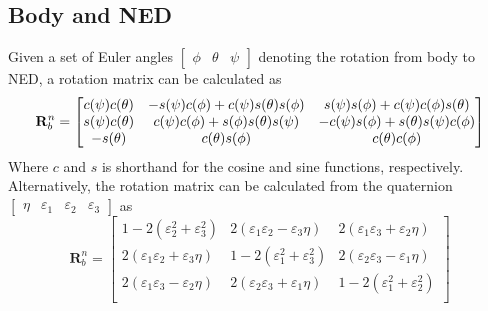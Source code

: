     \subsection{Body and NED}
        \label{app:rotnb}
        Given a set of Euler angles $\begin{bmatrix}\phi & \theta & \psi \end{bmatrix}$ denoting the rotation from body to NED, a rotation matrix can be calculated as
        \begin{equation}
            \label{eq:Rnb-eul}
            \mathbf{R}^n_b =
            \begin{bmatrix}
                c(\psi)c(\theta) & -s(\psi)c(\phi)+c(\psi)s(\theta)s(\phi)   & s(\psi)s(\phi)+c(\psi)c(\phi)s(\theta)\\
                s(\psi)c(\theta) & c(\psi)c(\phi)+s(\phi)s(\theta)s(\psi)    & -c(\psi)s(\phi)+s(\theta)s(\psi)c(\phi)\\
                -s(\theta)    & c(\theta)s(\phi)                 & c(\theta)c(\phi)\\
            \end{bmatrix}
        \end{equation}
        Where $c$ and $s$ is shorthand for the cosine and sine functions, respectively. Alternatively, the rotation matrix can be calculated from the quaternion $\begin{bmatrix}\eta & \varepsilon_1 & \varepsilon_2 & \varepsilon_3 \end{bmatrix}$ as
        \begin{equation}
            \label{eq:Rnb-quat}
            \mathbf{R}^n_b =
            \begin{bmatrix}
                1-2(\varepsilon_2^2+\varepsilon_3^2)   &2(\varepsilon_1\varepsilon_2-\varepsilon_3\eta) &2(\varepsilon_1\varepsilon_3+\varepsilon_2\eta)\\
                2(\varepsilon_1\varepsilon_2+\varepsilon_3\eta)      &1-2(\varepsilon_1^2+\varepsilon_3^2)   &2(\varepsilon_2\varepsilon_3-\varepsilon_1\eta)\\
                2(\varepsilon_1\varepsilon_3-\varepsilon_2\eta)      &2(\varepsilon_2\varepsilon_3+\varepsilon_1\eta) &1-2(\varepsilon_1^2+\varepsilon_2^2)\\
            \end{bmatrix}
        \end{equation}